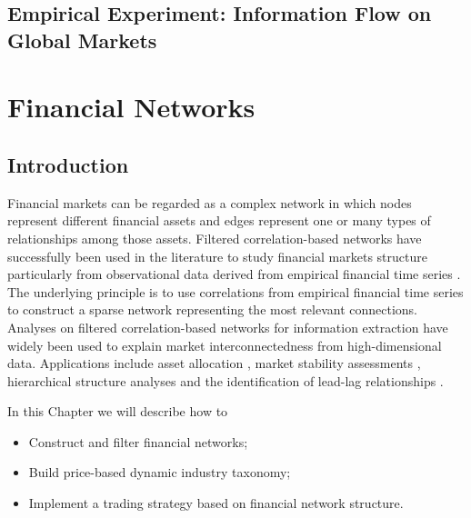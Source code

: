 \documentclass[]{book}
\providecommand{\tightlist}{%
  \setlength{\itemsep}{0pt}\setlength{\parskip}{0pt}}
\theoremstyle{definition}
\theoremstyle{definition}
\theoremstyle{definition}
\theoremstyle{remark}
\begin{document}
\section{Empirical Experiment: Information Flow on Global
Markets}\label{empirical-experiment-information-flow-on-global-markets}

\chapter{Financial Networks}\label{financial-networks}

\section{Introduction}\label{introduction-3}

Financial markets can be regarded as a complex network in which nodes
represent different financial assets and edges represent one or many
types of relationships among those assets. Filtered correlation-based
networks have successfully been used in the literature to study
financial markets structure particularly from observational data derived
from empirical financial time series
\citep[\citet{Tumminello26072005}]{bardoscia2017pathways, 10.1371/journal.pone.0017994, Mantegna1999, aste2010correlation, Tumminello201040}.
The underlying principle is to use correlations from empirical financial
time series to construct a sparse network representing the most relevant
connections. Analyses on filtered correlation-based networks for
information extraction \citep{song2008analysis, aste2010correlation}
have widely been used to explain market interconnectedness from
high-dimensional data. Applications include asset allocation
\citep{LI2018, pozzi2013spread}, market stability assessments
\citep{morales2012dynamical}, hierarchical structure analyses
\citep{Mantegna1999, aste2010correlation, Tumminello201040, musmeci2014clustering, song2012hierarchical}
and the identification of lead-lag relationships
\citep{curme2015coupled}.

In this Chapter we will describe how to

\begin{itemize}
\tightlist
\item
  Construct and filter financial networks;
\item
  Build price-based dynamic industry taxonomy;
\item
  Implement a trading strategy based on financial network structure.
\end{itemize}
\end{document}
